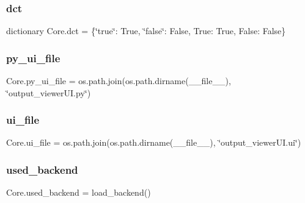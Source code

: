 \subsubsection{\texorpdfstring{dct}{dct}}
{\footnotesize\ttfamily dictionary Core.\+dct = \{\char`\"{}true\char`\"{}\+: True, \char`\"{}false\char`\"{}\+: False, True\+: True, False\+: False\}}

\hypertarget{namespace_core_a4cd2f45c63964d86002d7a37c7141973}{}\label{namespace_core_a4cd2f45c63964d86002d7a37c7141973} 
\subsubsection{\texorpdfstring{py\+\_\+ui\+\_\+file}{py\_ui\_file}}
{\footnotesize\ttfamily Core.\+py\+\_\+ui\+\_\+file = os.\+path.\+join(os.\+path.\+dirname(\+\_\+\+\_\+file\+\_\+\+\_\+), \char`\"{}output\+\_\+viewer\+U\+I.\+py\char`\"{})}

\hypertarget{namespace_core_a1363a763ded79810023c205b7ed824f0}{}\label{namespace_core_a1363a763ded79810023c205b7ed824f0} 
\subsubsection{\texorpdfstring{ui\+\_\+file}{ui\_file}}
{\footnotesize\ttfamily Core.\+ui\+\_\+file = os.\+path.\+join(os.\+path.\+dirname(\+\_\+\+\_\+file\+\_\+\+\_\+), \char`\"{}output\+\_\+viewer\+U\+I.\+ui\char`\"{})}

\hypertarget{namespace_core_a5233d27f0fe842cb39f926c4360e63dd}{}\label{namespace_core_a5233d27f0fe842cb39f926c4360e63dd} 
\subsubsection{\texorpdfstring{used\+\_\+backend}{used\_backend}}
{\footnotesize\ttfamily Core.\+used\+\_\+backend = load\+\_\+backend()}

